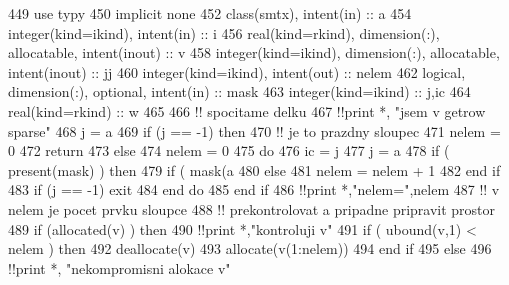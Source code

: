\begin{DoxyCode}
449         \textcolor{keywordtype}{use }typy
450         \textcolor{keywordtype}{implicit none}
452         \textcolor{keywordtype}{class}(smtx), \textcolor{keywordtype}{intent(in)} :: a
454         \textcolor{keywordtype}{integer(kind=ikind)}, \textcolor{keywordtype}{intent(in)} :: i
456         \textcolor{keywordtype}{real(kind=rkind)}, \textcolor{keywordtype}{dimension(:)}, \textcolor{keywordtype}{allocatable}, \textcolor{keywordtype}{intent(inout)} :: v
458         \textcolor{keywordtype}{integer(kind=ikind)}, \textcolor{keywordtype}{dimension(:)}, \textcolor{keywordtype}{allocatable}, \textcolor{keywordtype}{intent(inout)} :: jj
460         \textcolor{keywordtype}{integer(kind=ikind)}, \textcolor{keywordtype}{intent(out)} :: nelem
462         \textcolor{keywordtype}{logical}, \textcolor{keywordtype}{dimension(:)}, \textcolor{keywordtype}{optional}, \textcolor{keywordtype}{intent(in)} :: mask
463         \textcolor{keywordtype}{integer(kind=ikind)} :: j,ic
464         \textcolor{keywordtype}{real(kind=rkind)} :: w
465 
466         \textcolor{comment}{!! spocitame delku
}
467         \textcolor{comment}{!!print *, "jsem v getrow sparse"
}
468         j = a%
469         \textcolor{keywordflow}{if} (j == -1) then
470             \textcolor{comment}{!! je to prazdny sloupec
}
471             nelem = 0
472             return
473         else
474             nelem = 0
475             do
476                 ic = j
477                 j = a%
478                 \textcolor{keywordflow}{if} ( \textcolor{keyword}{present}(mask) ) then
479                     \textcolor{keywordflow}{if} ( mask(a%
480                 else
481                     nelem = nelem + 1
482 \textcolor{keyword}{                end }if
483                 \textcolor{keywordflow}{if} (j == -1) exit
484 \textcolor{keyword}{            end }do
485 \textcolor{keyword}{        end }if
486         \textcolor{comment}{!!print *,"nelem=",nelem
}
487         \textcolor{comment}{!! v nelem je pocet prvku sloupce
}
488         \textcolor{comment}{!! prekontrolovat a pripadne pripravit prostor
}
489         \textcolor{keywordflow}{if} (\textcolor{keyword}{allocated}(v) ) then
490             \textcolor{comment}{!!print *,"kontroluji v"
}
491             \textcolor{keywordflow}{if} ( ubound(v,1) < nelem ) then
492                 \textcolor{keyword}{deallocate}(v)
493                 \textcolor{keyword}{allocate}(v(1:nelem))
494 \textcolor{keyword}{            end }if
495         else
496             \textcolor{comment}{!!print *, "nekompromisni alokace v"
}
\end{DoxyCode}
